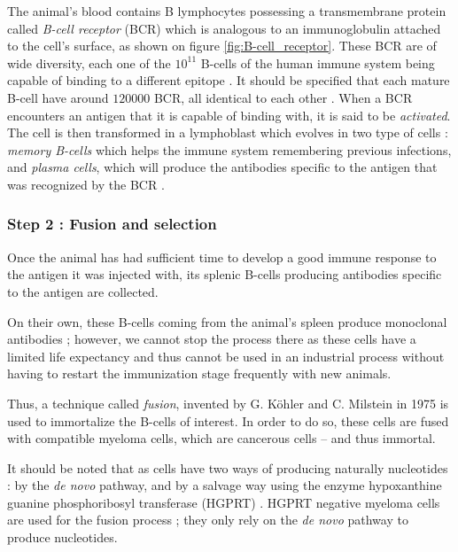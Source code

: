 The animal's blood contains B lymphocytes possessing a transmembrane protein
called \emph{B-cell receptor} (BCR) \cite{seifert_human_2016} 
which is analogous to an immunoglobulin 
attached to the cell's surface, as shown on figure \ref{fig:B-cell_receptor}.
These BCR are of wide diversity, each one of the $10^{11}$ B-cells of the human immune system 
being capable of binding to a different epitope \cite{reth_chapter_2015}.
It should be specified that each mature B-cell have around $120 000$ BCR,
all identical to each other \cite{reth_chapter_2015}.
When a BCR encounters an antigen that it is capable of binding
with, it is said to be \emph{activated}. The cell is then transformed in a 
lymphoblast which evolves in two type of cells : \emph{memory B-cells}
which helps the immune system remembering previous infections, and 
\emph{plasma cells}, which will produce the antibodies specific to the antigen that
was recognized by the BCR \cite{levine_b-cell_2000}.


\subsubsection{Step 2 : Fusion and selection}

Once the animal has had sufficient time to develop a good immune
response to the antigen it was injected with, its splenic B-cells
producing antibodies specific to the antigen are collected.

On their own, these B-cells coming from the animal's spleen produce
monoclonal antibodies ; however, we cannot stop the process there
as these cells have a limited life expectancy and thus cannot be
used in an industrial process without having to restart the immunization
stage frequently with new animals.

Thus, a technique called \emph{fusion}, invented by G. Köhler and
C. Milstein in 1975 \cite{kohler_continuous_1975} is used to immortalize
the B-cells of interest. In order to do so, these cells are fused with
compatible myeloma cells, which are cancerous cells -- and thus immortal.

It should be noted that as cells have two ways of producing naturally
nucleotides : by the \emph{de novo} pathway, and by a salvage way using the enzyme
hypoxanthine guanine phosphoribosyl transferase (HGPRT) \cite{mckeran_use_1976}.
HGPRT negative myeloma cells are used for the fusion process ; they only rely
on the \emph{de novo} pathway to produce nucleotides.

